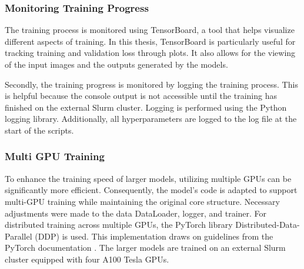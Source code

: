     \subsubsection{Monitoring Training Progress}
    
    The training process is monitored using TensorBoard, a tool that helps visualize different aspects of training. In this thesis, TensorBoard is particularly useful for tracking training and validation loss through plots. It also allows for the viewing of the input images and the outputs generated by the models.

    Secondly, the training progress is monitored by logging the training process. This is helpful because the console output is not accessible until the training has finished on the external Slurm cluster. Logging is performed using the Python logging library. Additionally, all hyperparameters are logged to the log file at the start of the scripts.



    \subsubsection{Multi GPU Training}
    
    To enhance the training speed of larger models, utilizing multiple GPUs can be significantly more efficient. Consequently, the model's code is adapted to support multi-GPU training while maintaining the original core structure. Necessary adjustments were made to the data DataLoader, logger, and trainer. For distributed training across multiple GPUs, the PyTorch library Distributed-Data-Parallel (DDP) is used. This implementation draws on guidelines from the PyTorch documentation \autocite{Subramanian2023}. The larger models are trained on an external Slurm cluster equipped with four A100 Tesla GPUs.



